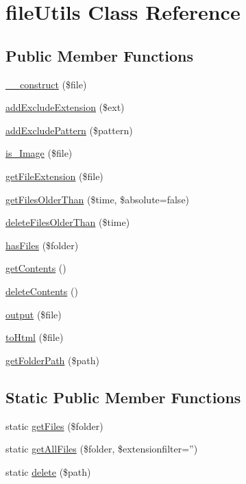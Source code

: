 \hypertarget{classfileUtils}{
\section{fileUtils Class Reference}
\label{classfileUtils}
}
\subsection*{Public Member Functions}
\begin{CompactItemize}
\item 
\hyperlink{classfileUtils_08e3f045c12ddf7cee8c58628e49439c}{\_\-\_\-construct} (\$file)
\item 
\hyperlink{classfileUtils_6c06a85fd126b8feee00d3d698e11867}{addExcludeExtension} (\$ext)
\item 
\hyperlink{classfileUtils_5931bcfd408acd6df733b2b4fc86c42f}{addExcludePattern} (\$pattern)
\item 
\hyperlink{classfileUtils_ba630d67291c6b07203727475fb71892}{is\_\-Image} (\$file)
\item 
\hyperlink{classfileUtils_1918c6f410a2efcb3785e48454f15eaf}{getFileExtension} (\$file)
\item 
\hyperlink{classfileUtils_d43043653535fb2f0ef0b95bddc46f5a}{getFilesOlderThan} (\$time, \$absolute=false)
\item 
\hyperlink{classfileUtils_f1e8a8b4cb39d0b9fa3244307d12601b}{deleteFilesOlderThan} (\$time)
\item 
\hyperlink{classfileUtils_6d22de4c9ff642da646509c79232208e}{hasFiles} (\$folder)
\item 
\hyperlink{classfileUtils_eb910d3f6118e783640da6491846371a}{getContents} ()
\item 
\hyperlink{classfileUtils_ac8851b20fce480f539ce45dc47b5267}{deleteContents} ()
\item 
\hyperlink{classfileUtils_21bdf01e738dd00bac4f7ca4456b9db6}{output} (\$file)
\item 
\hyperlink{classfileUtils_273687343a0710d2ae8629308af0f4f6}{toHtml} (\$file)
\item 
\hyperlink{classfileUtils_30432e38f6c0829d585c3d323899de52}{getFolderPath} (\$path)
\end{CompactItemize}
\subsection*{Static Public Member Functions}
\begin{CompactItemize}
\item 
static \hyperlink{classfileUtils_0c8875ede13b6dc57d60c62c2bbb16af}{getFiles} (\$folder)
\item 
static \hyperlink{classfileUtils_e093c5c265070d4ad5739bd1f649b4b8}{getAllFiles} (\$folder, \$extensionfilter='')
\item 
static \hyperlink{classfileUtils_dabc7aa5506dd8bcad28d9971f03256b}{delete} (\$path)
\end{CompactItemize}


